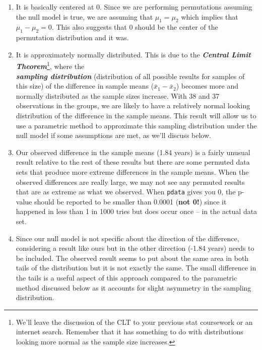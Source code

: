 \documentclass[]{book}
\let\rmarkdownfootnote\footnote%
\def\footnote{\protect\rmarkdownfootnote}
\begin{document}
\begin{enumerate}
\def\labelenumi{\arabic{enumi}.}
\item
  It is basically centered at 0. Since we are performing permutations
  assuming the null model is true, we are assuming that
  \(\mu_1 = \mu_2\) which implies that \(\mu_1 - \mu_2 = 0\). This also
  suggests that 0 should be the center of the permutation distribution
  and it was.
\item
  It is approximately normally distributed. This is due to the
  \textbf{\emph{Central Limit Theorem}}\footnote{We'll leave the
    discussion of the CLT to your previous stat coursework or an
    internet search. Remember that it has something to do with
    distributions looking more normal as the sample size increases.},
  where the\\
  \textbf{\emph{sampling distribution}} (distribution of all possible
  results for samples of this size) of the difference in sample means
  (\(\bar{x}_1 - \bar{x}_2\)) becomes more and normally distributed as
  the sample sizes increase. With 38 and 37 observations in the groups,
  we are likely to have a relatively normal looking distribution of the
  difference in the sample means. This result will allow us to use a
  parametric method to approximate this sampling distribution under the
  null model if some assumptions are met, as we'll discuss below.
\item
  Our observed difference in the sample means (1.84 years) is a fairly
  unusual result relative to the rest of these results but there are
  some permuted data sets that produce more extreme differences in the
  sample means. When the observed differences are really large, we may
  not see any permuted results that are as extreme as what we observed.
  When \texttt{pdata} gives you 0, the p-value should be reported to be
  smaller than 0.0001 (\textbf{not 0!}) since it happened in less than 1
  in 1000 tries but does occur once -- in the actual data set.
\item
  Since our null model is not specific about the direction of the
  difference, considering a result like ours but in the other direction
  (-1.84 years) needs to be included. The observed result seems to put
  about the same area in both tails of the distribution but it is not
  exactly the same. The small difference in the tails is a useful aspect
  of this approach compared to the parametric method discussed below as
  it accounts for slight asymmetry in the sampling distribution.
\end{enumerate}
\end{document}
